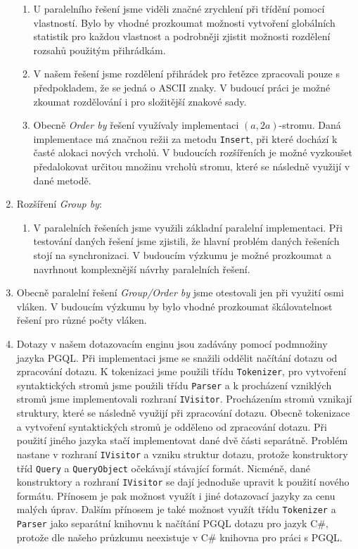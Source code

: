 \begin{enumerate}
\begin{enumerate}
\item
U paralelního řešení jsme viděli značné zrychlení při třídění pomocí vlastností.
Bylo by vhodné prozkoumat možnosti vytvoření globálních statistik pro každou vlastnost a podrobněji zjistit možnosti rozdělení rozsahů použitým přihrádkám.
\item
V našem řešení jsme rozdělení přihrádek pro řetězce zpracovali pouze s předpokladem, že se jedná o ASCII znaky.
V budoucí práci je možné zkoumat rozdělování i pro složitější znakové sady.
\item
Obecně \textit{Order by} řešení využívaly implementaci $(a, 2a)$-stromu.
Daná implementace má značnou režii za metodu \texttt{Insert}, při které dochází k časté alokaci nových vrcholů.
V budoucích rozšířeních je možné vyzkoušet předalokovat určitou množinu vrcholů stromu, které se následně využijí v dané metodě.
\end{enumerate}

\item Rozšíření \textit{Group by}:
\begin{enumerate}

\item
V paralelních řešeních jsme využili základní paralelní implementaci.
Při testování daných řešení jsme zjistili, že hlavní problém daných řešeních stojí na synchronizaci.
V budoucím výzkumu je možné prozkoumat a navrhnout komplexnější návrhy paralelních řešení.

\end{enumerate}

\item
Obecně paralelní řešení \textit{Group/Order by} jsme otestovali jen při využití osmi vláken.
V budoucím výzkumu by bylo vhodné prozkoumat škálovatelnost řešení pro různé počty vláken.
 
\item
Dotazy v našem dotazovacím enginu jsou zadávány pomocí podmnožiny jazyka PGQL.
Při implementaci jsme se snažili oddělit načítání dotazu od zpracování dotazu.
K tokenizaci jsme použili třídu \texttt{Tokenizer}, pro vytvoření syntaktických stromů jsme použili třídu \texttt{Parser} a k procházení vzniklých stromů jsme implementovali rozhraní \texttt{IVisitor}.
Procházením stromů vznikají struktury, které se následně využijí při zpracování dotazu.
Obecně tokenizace a vytvoření syntaktických stromů je odděleno od zpracování dotazu.
Při použití jiného jazyka stačí implementovat dané dvě části separátně.
Problém nastane v rozhraní \texttt{IVisitor} a vzniku struktur dotazu, protože konstruktory tříd \texttt{Query} a \texttt{QueryObject} očekávají stávající formát.
Nicméně, dané konstruktory a rozhraní \texttt{IVisitor} se dají jednoduše upravit k použití nového formátu.
Přínosem je pak možnost využít i jiné dotazovací jazyky za cenu malých úprav.
Dalším přínosem je také možnost využít třídu \texttt{Tokenizer} a \texttt{Parser} jako separátní knihovnu k načítání PGQL dotazu pro jazyk C\#, protože dle našeho průzkumu neexistuje v C\# knihovna pro práci s PGQL. 


\end{enumerate}
